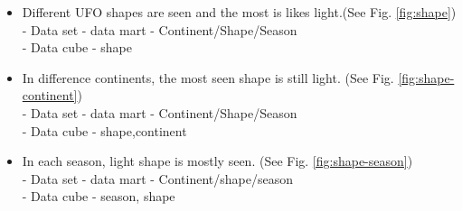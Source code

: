 \documentclass[11pt, journal]{IEEEtran}
\begin{document}
\begin{itemize}
\begin{itemize}
            \item Different UFO shapes are seen and the most is likes light.(See Fig. \ref{fig:shape})\\
            - Data set - data mart - Continent/Shape/Season\\
            - Data cube - shape
                
            \item In difference continents, the most seen shape is still light. (See Fig. \ref{fig:shape-continent})\\
            - Data set - data mart - Continent/Shape/Season\\
            - Data cube - shape,continent
                
            \item In each season, light shape is mostly seen. (See Fig. \ref{fig:shape-season})\\
            - Data set - data mart - Continent/shape/season\\
            - Data cube - season, shape
                

\end{itemize}
\end{itemize}
\end{document}
